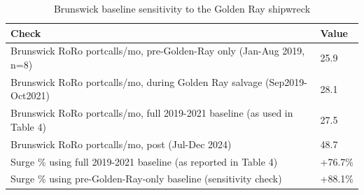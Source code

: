 \begin{table}
\caption{Brunswick baseline sensitivity to the Golden Ray shipwreck}
\label{tab:tableS4_golden_ray_sensitivity}
\begin{tabular}{ll}
\toprule
Check & Value \\
\midrule
Brunswick RoRo portcalls/mo, pre-Golden-Ray only (Jan-Aug 2019, n=8) & 25.9 \\
Brunswick RoRo portcalls/mo, during Golden Ray salvage (Sep2019-Oct2021) & 28.1 \\
Brunswick RoRo portcalls/mo, full 2019-2021 baseline (as used in Table 4) & 27.5 \\
Brunswick RoRo portcalls/mo, post (Jul-Dec 2024) & 48.7 \\
Surge \% using full 2019-2021 baseline (as reported in Table 4) & +76.7\% \\
Surge \% using pre-Golden-Ray-only baseline (sensitivity check) & +88.1\% \\
\bottomrule
\end{tabular}
\end{table}
